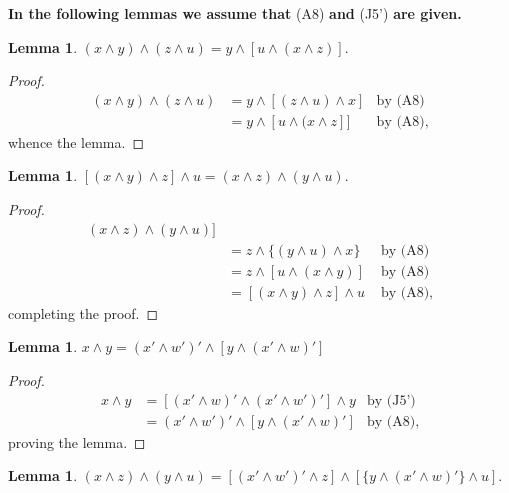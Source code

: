 \documentclass{amsart}
\theoremstyle{plain}
\newtheorem{lemma}[theorem]{Lemma}
\theoremstyle{problem}
\theoremstyle{definition}
\theoremstyle{remark}
\numberwithin{equation}{section}
\begin{document}
{\bf In the following lemmas we assume that} (A8) {\bf and} (J5') {\bf are given.}

\begin{lemma} \label{L0}  
 $(x \land y) \land (z \land u) = y \land [u \land (x \land z)].$  
\end{lemma}

\begin{proof}
\begin{align*}
(x \land y )\land (z  \land u)
       &= y \land [(z \land u) \land x] &\text{by (A8)}\\
       &= y \land [u \land (x \land z]] &\text{by (A8)},
\end{align*}
whence the lemma.
\end{proof}




\begin{lemma} \label{L1} 
 $[(x \land y) \land z] \land u = (x \land z) \land (y \land u).$  
\end{lemma}

\begin{proof}
\begin{align*}
    (x \land z) \land (y \land u)] \\
         &= z \land \{(y \land u) \land x\} &\text{ by (A8)}\\
         &= z \land [u \land (x \land y)] &\text{ by (A8)}\\
         &= [(x \land y) \land z] \land u &\text{ by (A8)},
\end{align*}
completing the proof.
\end{proof}

\begin{lemma} \label{L2} 
$x \land y = (x' \land w')' \land  [y \land (x' \land w)'] $  
\end{lemma}

\begin{proof}
\begin{align*}
x \land y &= [(x' \land w)' \land (x' \land w')'] \land y &\text{by (J5')}\\
&=(x' \land w')' \land  [y \land (x' \land w)']  &\text{by (A8)},
\end{align*}
proving the lemma.
\end{proof}

\begin{lemma} \label{L3} 
 $(x \land z) \land (y \land u) = [(x' \land w')' \land z] \land [\{y \land (x' \land w)'\} \land u]. $  
\end{lemma}
\end{document}
